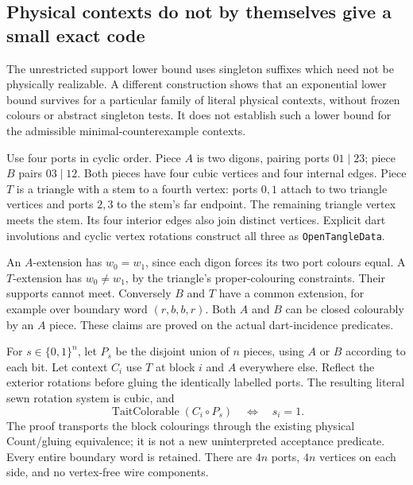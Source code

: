 \subsection{Physical contexts do not by themselves give a small exact code}
\label{sec:physical-context-bits}

The unrestricted support lower bound uses singleton suffixes which need
not be physically realizable. A different construction shows that an
exponential lower bound survives for a particular family of literal
physical contexts, without frozen colours or abstract singleton tests.
It does not establish such a lower bound for the admissible
minimal-counterexample contexts.

Use four ports in cyclic order. Piece $A$ is two digons, pairing ports
$01\mid23$; piece $B$ pairs $03\mid12$. Both pieces have four cubic
vertices and four internal edges. Piece $T$ is a triangle with a stem
to a fourth vertex: ports $0,1$ attach to two triangle vertices and
ports $2,3$ to the stem's far endpoint. The remaining triangle vertex
meets the stem. Its four interior edges also join distinct vertices.
Explicit dart involutions and cyclic vertex rotations construct all
three as \texttt{OpenTangleData}.

An $A$-extension has $w_0=w_1$, since each digon forces its two port
colours equal. A $T$-extension has $w_0\ne w_1$, by the triangle's
proper-colouring constraints. Their supports cannot meet. Conversely
$B$ and $T$ have a common extension, for example over boundary word
$(r,b,b,r)$. Both $A$ and $B$ can be closed colourably by an $A$ piece.
These claims are proved on the actual dart-incidence predicates.

For $s\in\{0,1\}^n$, let $P_s$ be the disjoint union of $n$ pieces,
using $A$ or $B$ according to each bit. Let context $C_i$ use $T$ at
block $i$ and $A$ everywhere else. Reflect the exterior rotations before
gluing the identically labelled ports. The resulting literal sewn
rotation system is cubic, and
\[
  \operatorname{TaitColorable}(C_i\circ P_s)
  \quad\Longleftrightarrow\quad s_i=1.
\]
The proof transports the block colourings through the existing physical
Count/gluing equivalence; it is not a new uninterpreted acceptance
predicate. Every entire boundary word is retained. There are $4n$ ports,
$4n$ vertices on each side, and no vertex-free wire components.

